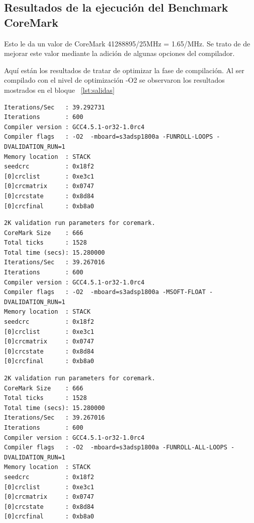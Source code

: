 				\subsection{Resultados de la ejecución del Benchmark CoreMark}
		
Esto le da un valor de CoreMark 41288895/25MHz = 1.65/MHz. Se trato de de mejorar este valor mediante la adición de algunas opciones del compilador.

Aquí están los resultados de tratar de optimizar la fase de compilación. Al ser compilado con el nivel de optimización -O2 se observaron los resultados mostrados en el bloque ~\ref{lst:salidas} 

\begin{lstlisting}[frame=single,caption={Optimización nivel -O2},label={lst:salidas},breaklines]
Iterations/Sec   : 39.292731
Iterations       : 600
Compiler version : GCC4.5.1-or32-1.0rc4
Compiler flags   : -O2  -mboard=s3adsp1800a -FUNROLL-LOOPS -DVALIDATION_RUN=1  
Memory location  : STACK
seedcrc          : 0x18f2
[0]crclist       : 0xe3c1
[0]crcmatrix     : 0x0747
[0]crcstate      : 0x8d84
[0]crcfinal      : 0xb8a0
\end{lstlisting}

\begin{lstlisting}[frame=single,caption={Optimización nivel -O2},label={lst:salidas},breaklines]
2K validation run parameters for coremark.
CoreMark Size    : 666
Total ticks      : 1528
Total time (secs): 15.280000
Iterations/Sec   : 39.267016
Iterations       : 600
Compiler version : GCC4.5.1-or32-1.0rc4
Compiler flags   : -O2  -mboard=s3adsp1800a -MSOFT-FLOAT -DVALIDATION_RUN=1  
Memory location  : STACK
seedcrc          : 0x18f2
[0]crclist       : 0xe3c1
[0]crcmatrix     : 0x0747
[0]crcstate      : 0x8d84
[0]crcfinal      : 0xb8a0
\end{lstlisting}

\begin{lstlisting}[frame=single,caption={Optimización nivel -O2},label={lst:salidas},breaklines]
2K validation run parameters for coremark.
CoreMark Size    : 666
Total ticks      : 1528
Total time (secs): 15.280000
Iterations/Sec   : 39.267016
Iterations       : 600
Compiler version : GCC4.5.1-or32-1.0rc4
Compiler flags   : -O2  -mboard=s3adsp1800a -FUNROLL-ALL-LOOPS -DVALIDATION_RUN=1  
Memory location  : STACK
seedcrc          : 0x18f2
[0]crclist       : 0xe3c1
[0]crcmatrix     : 0x0747
[0]crcstate      : 0x8d84
[0]crcfinal      : 0xb8a0
\end{lstlisting}

